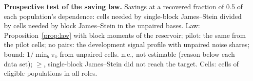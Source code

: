 \begin{table}[h]
\caption{\textbf{Prospective test of the saving law.} Savings at a recovered fraction of 0.5 of each population's dependence: cells needed by single-block James--Stein divided by cells needed by block James--Stein in the unpaired bases. Law: Proposition~\ref{prop:law} with block moments of the reservoir; pilot: the same from the pilot cells; no pairs: the development signal profile with unpaired noise shares; bound: $1/\min_b\pi_b$ from unpaired cells. n.e., not estimable (reason below each data set); $\geq$, single-block James--Stein did not reach the target. Cells: cells of eligible populations in all roles.}
\label{tab:pred}
\centering\scriptsize
\resizebox{\textwidth}{!}{}
\end{table}
